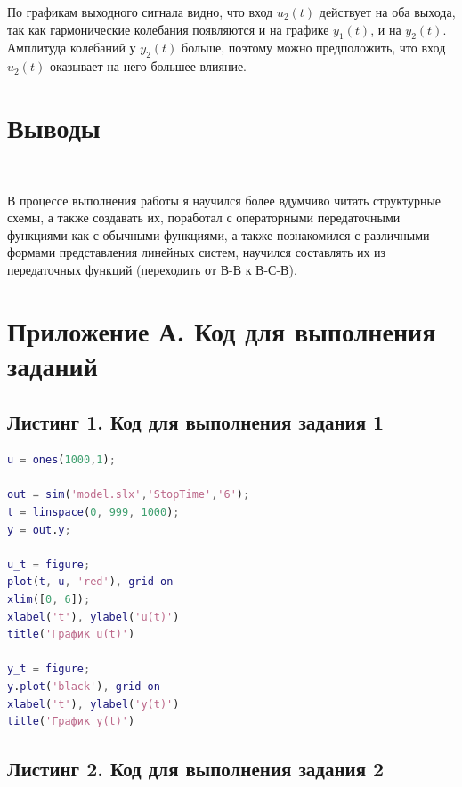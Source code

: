 \documentclass[a4paper]{article}
\begin{document}
По графикам выходного сигнала видно, что вход $u_2(t)$ действует на оба выхода, так как гармонические колебания появляются и на графике $y_1(t)$, и на $y_2(t)$. Амплитуда колебаний у $y_2(t)$ больше, поэтому можно предположить, что вход $u_2(t)$ оказывает на него большее влияние.

\section{Выводы}\

В процессе выполнения работы я научился более вдумчиво читать структурные схемы, а также создавать их, поработал с операторными передаточными функциями как с обычными функциями, а также познакомился с различными формами представления линейных систем, научился составлять их из передаточных функций (переходить от В-В к В-С-В).

\newpage

\section{Приложение А. Код для выполнения заданий}

\subsection*{Листинг 1. Код для выполнения задания 1}

\begin{lstlisting}[caption={Код для построения графиков для задания 1}, language=matlab]
u = ones(1000,1);

out = sim('model.slx','StopTime','6');
t = linspace(0, 999, 1000);
y = out.y;

u_t = figure;
plot(t, u, 'red'), grid on
xlim([0, 6]);
xlabel('t'), ylabel('u(t)')
title('График u(t)')

y_t = figure;
y.plot('black'), grid on
xlabel('t'), ylabel('y(t)')
title('График y(t)')
\end{lstlisting}


\subsection*{Листинг 2. Код для выполнения задания 2}
\end{document}
